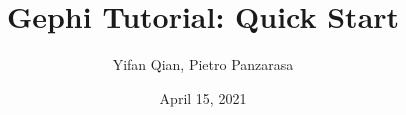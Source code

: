 \documentclass[10pt]{beamer}
\title[Gephi Tutorial: Quick Start]{Gephi Tutorial: Quick Start} %
\author{Yifan Qian, Pietro Panzarasa} %
\institute[QMUL] %
{
BUS346 Social Network Analysis \\
Queen Mary University of London \\ %
}
\date{April 15, 2021}
\begin{document}
\begin{frame}
\titlepage %
\end{frame}





\end{document}
